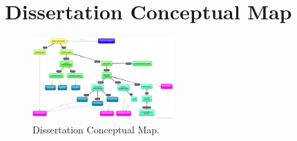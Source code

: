 \documentclass[
  twoside,
  11pt, a4paper,
  footinclude=true,
  headinclude=true,
  cleardoublepage=empty
]{scrbook}
\begin{document}
      \section{Dissertation Conceptual Map}
        \begin{figure}[h]
          \centering
          \includegraphics[angle=90,width=0.48\textwidth]{"./img/mind-map"}
          \caption[Dissertation Conceptual Map]{Dissertation Conceptual Map.}
          \label{appendix:concepts}
        \end{figure}



  \endgroup
\end{document}
